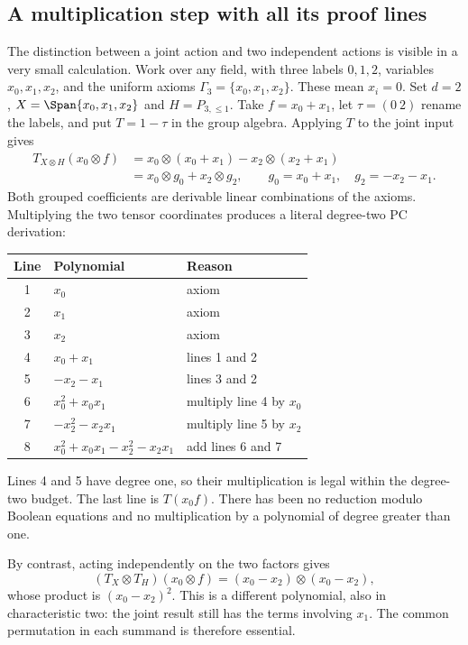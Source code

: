\subsection{A multiplication step with all its proof lines}
The distinction between a joint action and two independent actions is
visible in a very small calculation. Work over any field, with three
labels $0,1,2$, variables $x_0,x_1,x_2$, and the uniform axioms
$\Gamma_3=\{x_0,x_1,x_2\}$. These mean $x_i=0$. Set
$d=2$, $X=\Span\{x_0,x_1,x_2\}$ and $H=P_{3,\le1}$.
Take $f=x_0+x_1$, let $\tau=(0\ 2)$ rename the labels, and put
$T=1-\tau$ in the group algebra. Applying $T$ to the joint input gives
\begin{align*}
 T_{X\otimes H}(x_0\otimes f)
 &=x_0\otimes(x_0+x_1)-x_2\otimes(x_2+x_1)\\
 &=x_0\otimes g_0+x_2\otimes g_2,
 \qquad g_0=x_0+x_1,\quad g_2=-x_2-x_1.
\end{align*}
Both grouped coefficients are derivable linear combinations of the
axioms. Multiplying the two tensor coordinates produces a literal
degree-two PC derivation:
\begin{center}
\begin{tabular}{@{}cll@{}}
\toprule
Line & Polynomial & Reason\\
\midrule
1 & $x_0$ & axiom\\
2 & $x_1$ & axiom\\
3 & $x_2$ & axiom\\
4 & $x_0+x_1$ & lines 1 and 2\\
5 & $-x_2-x_1$ & lines 3 and 2\\
6 & $x_0^2+x_0x_1$ & multiply line 4 by $x_0$\\
7 & $-x_2^2-x_2x_1$ & multiply line 5 by $x_2$\\
8 & $x_0^2+x_0x_1-x_2^2-x_2x_1$ & add lines 6 and 7\\
\bottomrule
\end{tabular}
\end{center}
Lines 4 and 5 have degree one, so their multiplication is legal within
the degree-two budget. The last line is $T(x_0f)$. There has been no
reduction modulo Boolean equations and no multiplication by a
polynomial of degree greater than one.

By contrast, acting independently on the two factors gives
\[
 (T_X\otimes T_H)(x_0\otimes f)
       =(x_0-x_2)\otimes(x_0-x_2),
\]
whose product is $(x_0-x_2)^2$. This is a different polynomial, also in
characteristic two: the joint result still has the terms involving
$x_1$. The common permutation in each summand is therefore essential.

